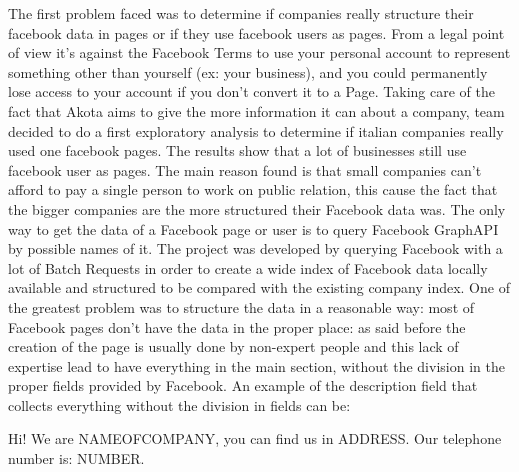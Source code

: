 The first problem faced was to determine if companies really structure their facebook data in pages or if they use facebook users as pages. 
From a legal point of view it's against the Facebook Terms to use your personal account to represent something other than yourself (ex: your business), and you could permanently lose access to your account if you don't convert it to a Page. Taking care of the fact that Akota aims to give the more information it can about a company, team decided to do a first exploratory analysis to determine if italian companies really used one facebook pages. The results show that a lot of businesses still use facebook user as pages. The main reason found is that small companies can't afford to pay a single person to work on public relation, this cause the fact that the bigger companies are the more structured their Facebook data was.
\cite{facebooksum}
The only way to get the data of a Facebook page or user is to query Facebook GraphAPI\cite{graphapi} by possible names of it. The project was developed by querying Facebook with a lot of Batch Requests in order to create a wide index of Facebook data locally available and structured to be compared with the existing company index. One of the greatest problem was to structure the data in a reasonable way: most of Facebook pages don't have the data in the proper place: as said before the creation of the page is usually done by non-expert people and this lack of expertise lead to have everything in the main section, without the division in the proper fields provided by Facebook.
An example of the description field that collects everything without the division in fields can be:



Hi! We are NAMEOFCOMPANY, you can find us in ADDRESS. Our telephone number is: NUMBER.


